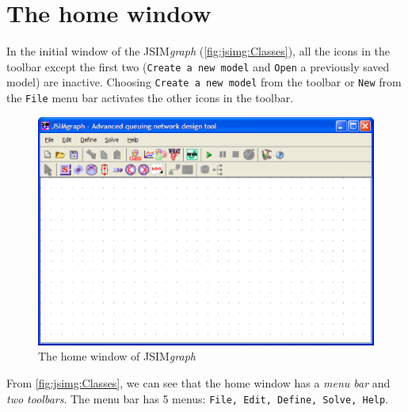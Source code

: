 \section{The home window} In the initial window of the
JSIM\emph{graph} (\autoref{fig:jsimg:Classes}), all the icons in
the toolbar except the first two (\texttt{Create a new model} and
\texttt{Open} a previously saved model) are inactive. Choosing
\texttt{Create a new model} from the toolbar or \texttt{New} from
the \texttt{File} menu bar activates the other icons in the
toolbar.
\begin{figure}[htbp]
    \begin{center}
        \includegraphics[scale=.5]{img/jsimg/2.1.eps}
    \end{center}
    \caption{The home window of JSIM\emph{graph}}
    \label{fig:jsimg:Classes}
\end{figure}
From \autoref{fig:jsimg:Classes}, we can see that the home window
has a \emph{menu bar} and \emph{two toolbars}. The menu bar has 5
menus: \texttt{File, Edit, Define,
Solve, Help}.\\

